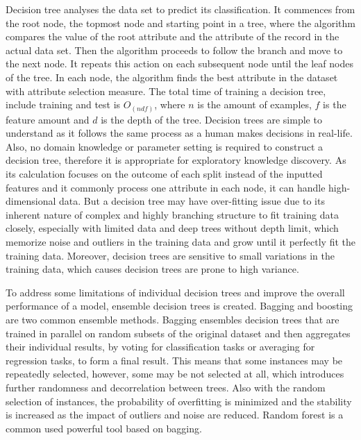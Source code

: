 \documentclass[12pt,a4paper,english
]{tunithesis}
\begin{document}
Decision tree analyses the data set to predict its classification. It commences from the root node, the topmost node and starting point in a tree, where the algorithm compares the value of the root attribute and the attribute of the record in the actual data set. Then the algorithm proceeds to follow the branch and move to the next node. It repeats this action on each subsequent node until the leaf nodes of the tree. In each node, the algorithm finds the best attribute in the dataset with attribute selection measure. The total time of training a decision tree, include training and test is ${O_{(ndf)}}$, where ${n}$ is the amount of examples, ${f}$ is the feature amount and ${d}$ is the depth of the tree. 
Decision trees are simple to understand as it follows the same process as a human makes decisions in real-life. Also, no domain knowledge or parameter setting is required to construct a decision tree, therefore it is appropriate for exploratory knowledge discovery. As its calculation focuses on the outcome of each split instead of the inputted features and it commonly process one attribute in each node, it can handle high-dimensional data. But a decision tree may have over-fitting issue due to its inherent nature of complex and highly branching structure to fit training data closely, especially with limited data and deep trees without depth limit, which memorize noise and outliers in the training data and grow until it perfectly fit the training data. Moreover, decision trees are sensitive to small variations in the training data, which causes decision trees are prone to high variance.

To address some limitations of individual decision trees and improve the overall performance of a model, ensemble decision trees is created. Bagging and boosting are two common ensemble methods. Bagging ensembles decision trees that are trained in parallel on random subsets of the original dataset and then aggregates their individual results, by voting for classification tasks or averaging for regression tasks, to form a final result. This means that some instances may be repeatedly selected, however, some may be not selected at all, which introduces further randomness and decorrelation between trees. Also with the random selection of instances, the probability of overfitting is minimized and the stability is increased as the impact of outliers and noise are reduced. Random forest is a common used powerful tool based on bagging.
\end{document}
